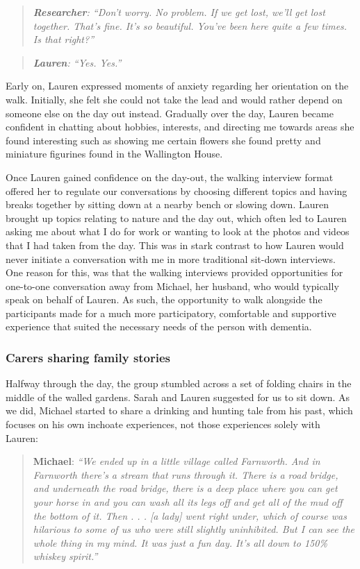 \begin{quote}    
\textit{    \textbf{Researcher}: ``Don't worry. No problem. If we get lost, we'll get lost together. That's fine. It's so beautiful. You've been here quite a few times. Is that right?''
}    \end{quote}
    \begin{quote}    

\textit{    \textbf{Lauren}: ``Yes. Yes.''
}\end{quote}

Early on, Lauren expressed moments of anxiety regarding her orientation on the walk. Initially, she felt she could not take the lead and would rather depend on someone else on the day out instead. Gradually over the day, Lauren became confident in chatting about hobbies, interests, and directing me towards areas she found interesting such as showing me certain flowers she found pretty and miniature figurines found in the Wallington House.

Once Lauren gained confidence on the day-out, the walking interview format offered her to regulate our conversations by choosing different topics and having breaks together by sitting down at a nearby bench or slowing down. Lauren brought up topics relating to nature and the day out, which often led to Lauren asking me about what I do for work or wanting to look at the photos and videos that I had taken from the day. This was in stark contrast to how Lauren would never initiate a conversation with me in more traditional sit-down interviews. One reason for this, was that the walking interviews provided opportunities for one-to-one conversation away from Michael, her husband, who would typically speak on behalf of Lauren. As such, the opportunity to walk alongside the participants made for a much more participatory, comfortable and supportive experience that suited the necessary needs of the person with dementia.

\subsubsection{Carers sharing family stories}
Halfway through the day, the group stumbled across a set of folding chairs in the middle of the walled gardens. Sarah and Lauren suggested for us to sit down. As we did, Michael started to share a drinking and hunting tale from his past, which focuses on his own inchoate experiences, not those experiences solely with Lauren:

\begin{quote}
\textbf{Michael}:\textit{    ``We ended up in a little village called Farnworth. And in Farnworth there's a stream that runs through it. There is a road bridge, and underneath the road bridge, there is a deep place where you can get your horse in and you can wash all its legs off and get all of the mud off the bottom of it. Then . . . [a lady] went right under, which of course was hilarious to some of us who were still slightly uninhibited. But I can see the whole thing in my mind. It was just a fun day. It's all down to 150\% whiskey spirit.''
}\end{quote}

